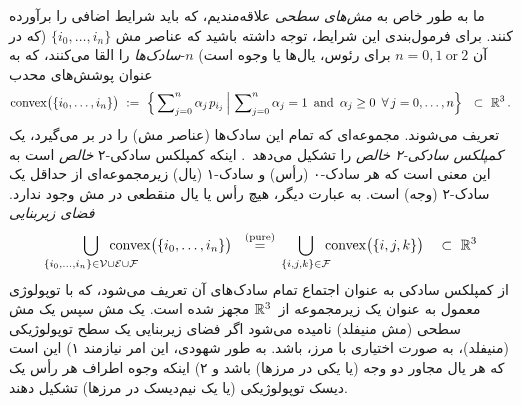 ما به طور خاص به \emph{مش‌های سطحی} علاقه‌مندیم، که باید شرایط اضافی را برآورده کنند.
برای فرمول‌بندی این شرایط، توجه داشته باشید که عناصر مش $\{ i_0, \dots, i_n \}$
(که در آن $n=0,1\ \text{or}\ 2$ برای رئوس، یال‌ها یا وجوه است)
$n$-\emph{سادک‌ها} را القا می‌کنند، که به عنوان پوشش‌های محدب
\begin{align}
    \operatorname{convex} \!\big(\{ i_0, \dots, i_n \}\big)\ :=\ 
    \Big\{ \sum\nolimits_{j=0}^n \alpha_j\mkern2mu p_{i_j} \,\Big|\, 
    \sum\nolimits_{j=0}^n \alpha_j = 1\,\ \textup{and}\,\ \alpha_j\geq0\,\ \forall\,j=0,\dots,n \Big\}
    \ \ \subset\ \R^3 \,.
\end{align}
تعریف می‌شوند. مجموعه‌ای که تمام این سادک‌ها (عناصر مش) را در بر می‌گیرد، یک \emph{کمپلکس سادکی-۲ خالص} را تشکیل می‌دهد~\cite{desbrun2005DiscreteExteriorCalculus,craneDiscreteDifferentialGeometry2014}.
اینکه کمپلکس سادکی-۲ \emph{خالص} است به این معنی است که هر سادک-۰ (رأس) و سادک-۱ (یال) زیرمجموعه‌ای از حداقل یک سادک-۲ (وجه) است.
به عبارت دیگر، هیچ رأس یا یال منقطعی در مش وجود ندارد.
\emph{فضای زیربنایی}
\begin{align}
    \bigcup_{\{ i_0, \dots, i_n \} \in \mathcal{V} \cup \mathcal{E} \cup \mathcal{F}}
    \mkern-40mu
    \operatorname{convex} \!\big( \{ i_0, \dots, i_n \}\big)
    \ \ \overset{\textup{(pure)}}{=}\,
    \bigcup_{\{i,j,k\} \in \mathcal{F}}
    \mkern-10mu
    \operatorname{convex} \!\big( \{i,j,k\}\big)
    \ \ \ \subset\ \R^3
\end{align}
از کمپلکس سادکی به عنوان اجتماع تمام سادک‌های آن تعریف می‌شود، که با توپولوژی معمول به عنوان یک زیرمجموعه از~$\mathbb{R}^3$ مجهز شده است.
یک مش سپس یک مش سطحی (مش منیفلد) نامیده می‌شود اگر فضای زیربنایی یک سطح توپولوژیکی (منیفلد)، به صورت اختیاری با مرز، باشد.
به طور شهودی، این امر نیازمند
۱) این است که هر یال مجاور دو وجه (یا یکی در مرزها) باشد و
۲) اینکه وجوه اطراف هر رأس یک دیسک توپولوژیکی (یا یک نیم‌دیسک در مرزها) تشکیل دهند.


